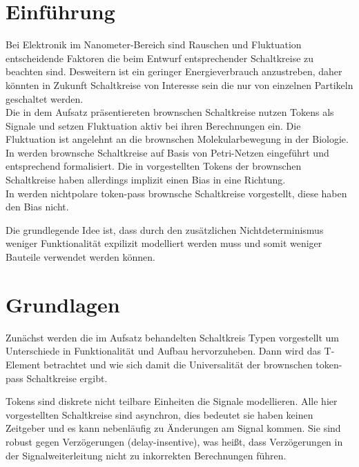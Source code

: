 \documentclass[11pt,a4paper]{article}
\begin{document}
\clearpage

\section{Einführung}
Bei Elektronik im Nanometer-Bereich sind Rauschen und Fluktuation 
entscheidende Faktoren die beim Entwurf entsprechender Schaltkreise 
zu beachten sind.
%
Desweitern ist ein geringer Energieverbrauch anzustreben, daher 
könnten in Zukunft Schaltkreise von Interesse sein die nur von einzelnen 
Partikeln geschaltet werden. \\
%
Die in dem Aufsatz \cite{Peper_nonPolar_2018} präsentiereten brownschen
Schaltkreise nutzen Tokens als Signale und setzen
Fluktuation aktiv bei ihren Berechnungen ein.
%
Die Fluktuation ist angelehnt an die brownschen Molekularbewegung 
in der Biologie. \\
%
In \cite{Peper_Fundamentals_2013} werden brownsche Schaltkreise 
auf Basis von Petri-Netzen eingeführt und entsprechend formalisiert.
%
Die in \cite{Peper_Fundamentals_2013} vorgestellten Tokens der brownschen
Schaltkreise haben allerdings implizit einen Bias in eine Richtung. \\ 
%
In \cite{Peper_nonPolar_2018} werden nichtpolare token-pass
brownsche Schaltkreise vorgestellt, diese haben den Bias nicht.

Die grundlegende Idee ist, dass durch den zusätzlichen Nichtdeterminismus 
weniger Funktionalität expilizit modelliert werden muss 
und somit weniger Bauteile verwendet werden können.



\section{Grundlagen}
Zunächst werden die im Aufsatz behandelten Schaltkreis Typen vorgestellt 
um Unterschiede in Funktionalität und Aufbau hervorzuheben.  
%
Dann wird das T-Element betrachtet und wie sich damit die Universalität der
brownschen token-pass Schaltkreise ergibt. 

\smallskip Tokens sind diskrete nicht teilbare Einheiten die Signale modellieren.
%
Alle hier vorgestellten Schaltkreise sind asynchron, dies bedeutet sie haben
keinen Zeitgeber und es kann nebenläufig zu Änderungen am Signal kommen.
%
Sie sind robust gegen Verzögerungen (delay-insentive),
was heißt, dass Verzögerungen in der Signalweiterleitung 
nicht zu inkorrekten Berechnungen führen.
\end{document}
